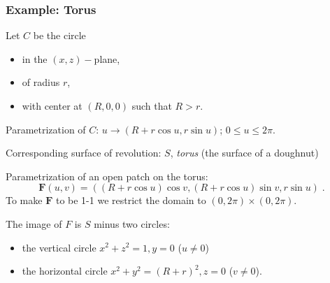 \begin{frame}
  \frametitle{Example: Torus}

  Let $C$ be the circle
  \begin{itemize}
    \item in the $(x,z)-$plane,
    \item of radius $r$,
    \item with center at $(R,0,0)$  such that $R > r$.
  \end{itemize}

  Parametrization of $C$: \pause $u \to (R+r\cos{u}, r\sin{u})$; $0 \leqslant u \leqslant 2\pi$.

  Corresponding surface of revolution: $S$\pause , \emph{torus} (the surface of a doughnut)

  Parametrization of an open patch on the torus:\pause
%
$$\textbf{F}(u,v) = ((R+r\cos{u})\cos{v}, (R+r\cos{u})\sin{v}, r\sin{u})\; .$$
%
\pause To make $\textbf{F}$ to be 1-1 we restrict the domain to $(0,2\pi) \times (0,2\pi)$.

The image of $F$ is \pause $S$ minus two circles:
\begin{itemize}
  \item the vertical circle $x^2+z^2=1, y=0$ ($u \neq 0$)
  \item the horizontal circle $x^2+y^2 = (R+r)^2, z=0$ ($v \neq 0$).
\end{itemize}

\end{frame}